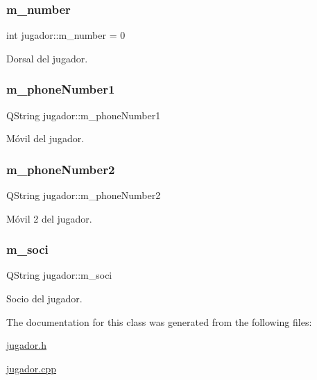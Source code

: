 \subsubsection{\texorpdfstring{m\+\_\+number}{m\_number}}
{\footnotesize\ttfamily int jugador\+::m\+\_\+number = 0\hspace{0.3cm}{\ttfamily [private]}}

Dorsal del jugador. \mbox{\label{classjugador_a1ea251ca9e7696bd7580683e5900d265}} 
\subsubsection{\texorpdfstring{m\+\_\+phone\+Number1}{m\_phoneNumber1}}
{\footnotesize\ttfamily Q\+String jugador\+::m\+\_\+phone\+Number1\hspace{0.3cm}{\ttfamily [private]}}

Móvil del jugador. \mbox{\label{classjugador_aed7290d4b5d54775a3ed94304b6f6a30}} 
\subsubsection{\texorpdfstring{m\+\_\+phone\+Number2}{m\_phoneNumber2}}
{\footnotesize\ttfamily Q\+String jugador\+::m\+\_\+phone\+Number2\hspace{0.3cm}{\ttfamily [private]}}

Móvil 2 del jugador. \mbox{\label{classjugador_af17085c4ca78df6e7820c46c902a8a44}} 
\subsubsection{\texorpdfstring{m\+\_\+soci}{m\_soci}}
{\footnotesize\ttfamily Q\+String jugador\+::m\+\_\+soci\hspace{0.3cm}{\ttfamily [private]}}

Socio del jugador. 

The documentation for this class was generated from the following files\+:\begin{DoxyCompactItemize}
\item 
\mbox{\hyperlink{jugador_8h}{jugador.\+h}}\item 
\mbox{\hyperlink{jugador_8cpp}{jugador.\+cpp}}\end{DoxyCompactItemize}
